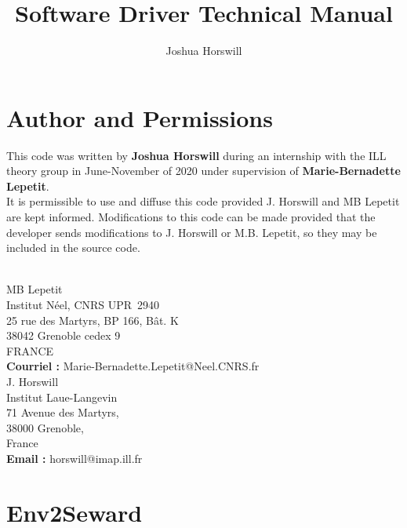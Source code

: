 \documentclass[10pt]{article}
\author{Joshua Horswill}
\title{Software Driver Technical Manual}
\begin{document}
\maketitle
\tableofcontents

\section{Author and Permissions}
This code was written by {\bf Joshua Horswill} during an internship with the ILL theory group in June-November of 2020 under supervision of {\bf Marie-Bernadette Lepetit}. 
\\

It is permissible to use and diffuse this code provided J. Horswill and MB Lepetit are kept informed. Modifications to this code can be made provided that the developer sends modifications to J. Horswill or M.B. Lepetit, so they may be included in the source code.
\\
\\

\hspace*{3cm}                
\begin{minipage}{10cm}
	MB Lepetit \\
	Institut Néel, CNRS UPR~2940 \\                       
	25 rue des Martyrs, BP 166, Bât. K\\
	38042 Grenoble cedex 9 \\
	FRANCE \\[+1ex]                                          
	{\bf Courriel :} Marie-Bernadette.Lepetit@Neel.CNRS.fr  \\
	
	J. Horswill \\
	Institut Laue-Langevin\\            
	71 Avenue des Martyrs,\\  
	38000 Grenoble,\\
	France\\[+1ex]                                          
	{\bf Email :} horswill@imap.ill.fr  \\
\end{minipage}
\section{Env2Seward}
\end{document}
